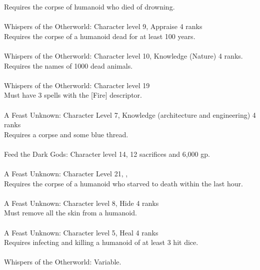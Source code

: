 \begin{multicols}{2}
\begin{small}
Requires the corpse of humanoid who died of drowning.\\
\\
Whispers of the Otherworld: Character level 9, Appraise 4 ranks\\
Requires the corpse of a humanoid dead for at least 100 years.\\
\\
Whispers of the Otherworld: Character level 10, Knowledge (Nature) 4 ranks.\\
Requires the names of 1000 dead animals.\\
\\
Whispers of the Otherworld: Character level 19\\
Must have 3 spells with the [Fire] descriptor.\\
\\
A Feast Unknown: Character Level 7, Knowledge (architecture and engineering) 4 ranks\\
Requires a corpse and some blue thread.\\
\\
Feed the Dark Gods: Character level 14, 12 sacrifices and 6,000 gp.\\
\\
A Feast Unknown: Character Level 21, , \\
Requires the corpse of a humanoid who starved to death within the last hour.\\
\\
A Feast Unknown: Character level 8, Hide 4 ranks\\
Must remove all the skin from a humanoid.\\
\\
A Feast Unknown: Character level 5, Heal 4 ranks\\
Requires infecting and killing a humanoid of at least 3 hit dice.\\
\\
Whispers of the Otherworld: Variable.\\
\\

\end{small}
\end{multicols}
